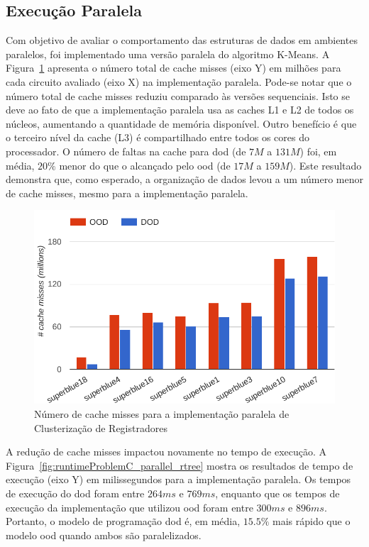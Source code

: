 \subsection{Execução Paralela}
\label{subsec:execucaoParalelaProblemaC}

Com objetivo de avaliar o comportamento das estruturas de dados em ambientes paralelos, foi implementado uma versão paralela do algoritmo K-Means.
A Figura~\ref{fig:missProblemC_parallel_rtree} apresenta o número total de cache misses (eixo Y) em milhões para cada circuito avaliado (eixo X) na implementação paralela.
Pode-se notar que o número total de cache misses reduziu comparado às versões sequenciais. Isto se deve ao fato de que a implementação paralela usa as caches L1 e L2 de todos os núcleos, aumentando a quantidade de memória disponível. Outro benefício é que o terceiro nível da cache (L3) é compartilhado entre todos os cores do processador.
O número de faltas na cache para \ac{dod} (de $7M$ a $131M$) foi, em média, $20\%$ menor do que o alcançado pelo \ac{ood} (de $17M$ a $159M$). Este resultado demonstra que, como esperado, a organização de dados levou a um número menor de cache misses, mesmo para a implementação paralela.

\begin{figure}[ht]
    \centering
    \includegraphics[width=0.7\linewidth]{img/results/missProblemC_parallel_rtree}
    \caption[Cache misses Problema~C versão paralela]{Número de cache misses para a implementação paralela de Clusterização de Registradores}
    \label{fig:missProblemC_parallel_rtree}
\end{figure}

A redução de cache misses impactou novamente no tempo de execução. A Figura~\ref{fig:runtimeProblemC_parallel_rtree} mostra os resultados de tempo de execução (eixo Y) em milissegundos para a implementação paralela. Os tempos de execução do \ac{dod} foram entre $264ms$ e $769ms$, enquanto que os tempos de execução da implementação que utilizou \ac{ood} foram entre $ 300ms $ e $ 896ms $. Portanto, o modelo de programação \ac{dod} é, em média, $ 15.5\% $ mais rápido que o modelo \ac{ood} quando ambos são paralelizados.


